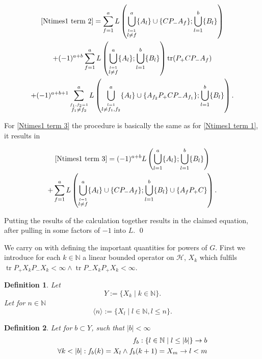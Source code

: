 \documentclass[b5paper,draft,openbib,12pt]{memoir}
\newtheorem{Def}{Definition}
\DeclareMathOperator{\tr}{tr}
\begin{document}
\begin{multline}
\eqref{Ntimes1 term 2}=\sum_{f=1}^a L\left( \bigcup_{\stackrel{l=1}{l\neq f}}^a \{A_l\}\cup \{C P_- A_f\}; \bigcup_{l=1}^b \{B_l\}\right)\\
+(-1)^{a+b}\sum_{f=1}^a  L\left( \bigcup_{\stackrel{l=1}{l\neq f}}^a \{A_l\}; \bigcup_{l=1}^b \{B_l\} \right) \tr (P_+ C P_- A_f )\\
+(-1)^{a+b+1}\sum_{\stackrel{f_1,f_2=1}{f_1\neq f_2}}^a L\left( \bigcup_{\stackrel{l=1}{l\neq f_1,f_2}}^a \{A_l\} \cup \{A_{f_2} P_+CP_- A_{f_1} \}; \bigcup_{l=1}^b \{B_l\} \right).
\end{multline}

For \eqref{Ntimes1 term 3} the procedure is basically the same as for \eqref{Ntimes1 term 1}, it results in

\begin{multline}
\eqref{Ntimes1 term 3}= (-1)^{a+b} L\left( \bigcup_{l=1}^a \{A_l\}; \bigcup_{l=1}^b \{B_l\}\right)\\
+ \sum_{f=1}^a L\left( \bigcup_{\stackrel{l=1}{l \neq f}}^a \{A_l\}\cup \{C P_- A_f\}; \bigcup_{l=1}^b \{B_l\}\cup \{A_f P_+ C\}\right).
\end{multline}

Putting the results of the calculation together results in the claimed equation, after pulling in some factors of \(-1\) into \(L\). \qed

We carry on with defining the important quantities for powers of \(G\). First we introduce for each \(k \in \mathbb{N}\) a linear
bounded operator on \(\mathcal{H}\), \(X_k\) which fulfils \(\tr P_+ X_k P_- X_k<\infty\wedge \tr P_- X_k P_+ X_k<\infty\). 

\begin{Def}
Let 
\begin{equation*}
Y:=\{X_k\mid k\in\mathbb{N}\}.
\end{equation*}
Let for \(n\in\mathbb{N}\)
\begin{equation*}
\langle n\rangle := \{X_l\mid l\in\mathbb{N}, l\le n\}.
\end{equation*}
\end{Def}

\begin{Def}
Let for  \(b\subset Y\), such that \(|b|<\infty\)
\begin{align}\notag
f_b:\{l\in\mathbb{N}\mid l\le |b|\}\rightarrow b\\
\forall k<|b| : f_b(k)=X_l\wedge f_b(k+1)=X_m\rightarrow l<m
\end{align}
\end{Def}
\end{document}
